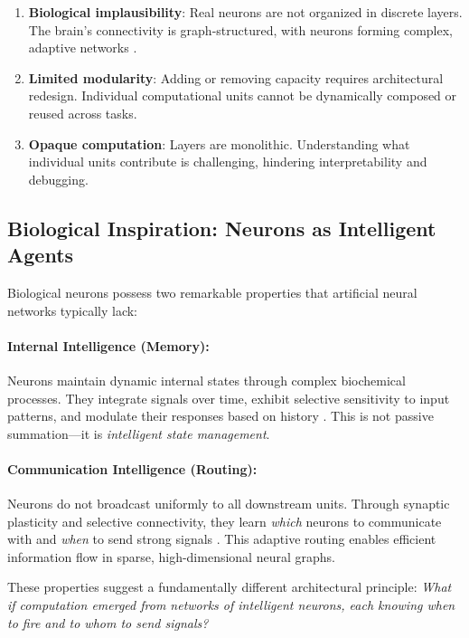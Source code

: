 \documentclass{article}
\begin{document}
\begin{enumerate}
    \item \textbf{Biological implausibility}: Real neurons are not organized in discrete layers. The brain's connectivity is graph-structured, with neurons forming complex, adaptive networks \cite{sporns2004organization}.
    \item \textbf{Limited modularity}: Adding or removing capacity requires architectural redesign. Individual computational units cannot be dynamically composed or reused across tasks.
    \item \textbf{Opaque computation}: Layers are monolithic. Understanding what individual units contribute is challenging, hindering interpretability and debugging.
\end{enumerate}

\subsection{Biological Inspiration: Neurons as Intelligent Agents}

Biological neurons possess two remarkable properties that artificial neural networks typically lack:

\paragraph{Internal Intelligence (Memory):} Neurons maintain dynamic internal states through complex biochemical processes. They integrate signals over time, exhibit selective sensitivity to input patterns, and modulate their responses based on history \cite{gerstner2014neuronal}. This is not passive summation—it is \emph{intelligent state management}.

\paragraph{Communication Intelligence (Routing):} Neurons do not broadcast uniformly to all downstream units. Through synaptic plasticity and selective connectivity, they learn \emph{which} neurons to communicate with and \emph{when} to send strong signals \cite{hebb1949organization}. This adaptive routing enables efficient information flow in sparse, high-dimensional neural graphs.

These properties suggest a fundamentally different architectural principle: \emph{What if computation emerged from networks of intelligent neurons, each knowing when to fire and to whom to send signals?}
\end{document}
